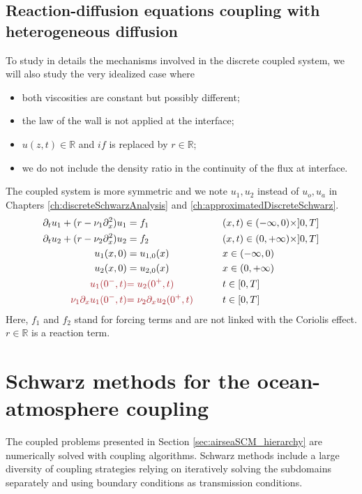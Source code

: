 \subsection{Reaction-diffusion equations coupling
with heterogeneous diffusion}
\label{sec:airseaSCM_reactionDiffusionSection}
To study in details the mechanisms involved in
the discrete coupled system, we will also study the very idealized
case where
\begin{itemize}
	\item both viscosities are constant but possibly different;
	\item the law of the wall is not applied
		at the interface;
	\item $u(z,t) \in\mathbb{R}$ and $if$ is replaced by
		$r\in\mathbb{R}$;
	\item we do not include the density ratio
	in the continuity of the flux at interface.
\end{itemize}
The coupled system is more symmetric and we note
$u_1, u_2$ instead of $u_o, u_a$ in Chapters
\ref{ch:discreteSchwarzAnalysis} and
\ref{ch:approximatedDiscreteSchwarz}.
\begin{subequations}
\begin{align}
\partial_t u_1 +( r - \nu_1 \partial_x^2) u_1 &= f_1  &\qquad& (x,t) \in (-\infty,0) \times ]0,T] \label{eq:airseaSCM_dr1} \\
\partial_t u_2 + ( r - \nu_2 \partial_x^2) u_2  &= f_2  &\qquad& (x,t) \in (0,+\infty) \times ]0,T] \label{eq:airseaSCM_dr2}\\
	u_1(x,0) &= u_{1,0}(x)   &\qquad&  x \in (-\infty,0)
	\label{eq:airseaSCM_initialCond1} \\
u_2(x,0) &= u_{2,0}(x)   &\qquad&  x \in (0,+\infty)
	\label{eq:airseaSCM_initialCond2} \\
	\emphase{u_1(0^-,t)} &\emphase{=  u_2(0^+,t)}
	&\qquad& t \in [0,T] \label{eq:airseaSCM_interface-dir} \\
	\emphase{\nu_1 \partial_x u_1(0^-,t)} &
	\emphase{= \nu_2 \partial_x u_2(0^+,t)} &\qquad& t \in [0,T] \label{eq:airseaSCM_interface-neu} 
\end{align}
\label{eq:model-problem}
\end{subequations}
Here, $f_1$ and $f_2$
stand for forcing terms and are not linked with the Coriolis effect.
$r\in \mathbb{R}$ is a reaction term.
%
\section{Schwarz methods for the ocean-atmosphere coupling}
\label{sec:airseaSCM_Schwarz}
The coupled problems presented in Section
\ref{sec:airseaSCM_hierarchy} are numerically solved with
coupling algorithms.
Schwarz methods include a large diversity of coupling
strategies relying on iteratively solving
the subdomains separately and using boundary
conditions as transmission conditions.

